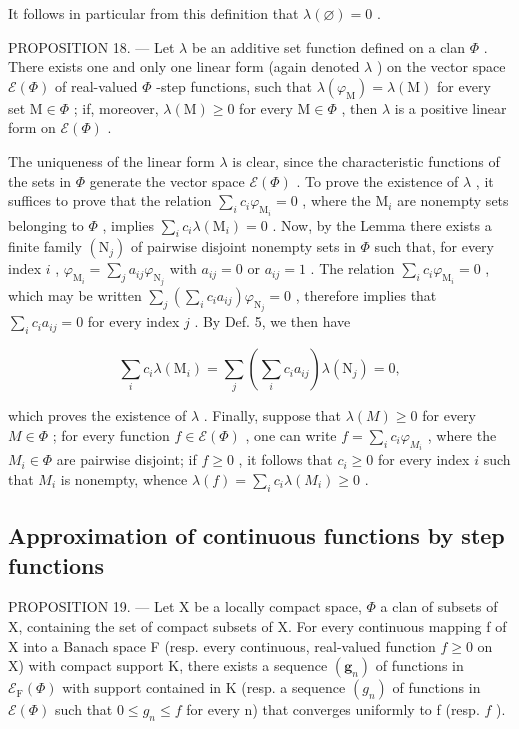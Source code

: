It follows in particular from this definition that \(\lambda(\varnothing)=0\) .

PROPOSITION 18. --- Let \(\lambda\) be an additive set function defined on a clan \(\Phi\) . There exists one and only one linear form (again denoted \(\lambda\) ) on the vector space \(\mathcal{E}(\Phi)\) of real-valued \(\Phi\) -step functions, such that \(\lambda(\varphi_{\mathrm{M}}) = \lambda(\mathrm{M})\) for every set \(\mathrm{M} \in \Phi\) ; if, moreover, \(\lambda(\mathrm{M}) \geqslant 0\) for every \(\mathrm{M} \in \Phi\) , then \(\lambda\) is a positive linear form on \(\mathcal{E}(\Phi)\) .

The uniqueness of the linear form \(\lambda\) is clear, since the characteristic functions of the sets in \(\Phi\) generate the vector space \(\mathcal{E}(\Phi)\) . To prove the existence of \(\lambda\) , it suffices to prove that the relation \(\sum_{i} c_i \varphi_{\mathrm{M}_i} = 0\) , where the \(\mathrm{M}_i\) are nonempty sets belonging to \(\Phi\) , implies \(\sum_{i} c_i \lambda(\mathrm{M}_i) = 0\) . Now, by the Lemma there exists a finite family \((\mathrm{N}_j)\) of pairwise disjoint nonempty sets in \(\Phi\) such that, for every index \(i\) , \(\varphi_{\mathrm{M}_i} = \sum_{j} a_{ij} \varphi_{\mathrm{N}_j}\) with \(a_{ij} = 0\) or \(a_{ij} = 1\) . The relation \(\sum_{i} c_i \varphi_{\mathrm{M}_i} = 0\) , which may be written \(\sum_{j} \left( \sum_{i} c_i a_{ij} \right) \varphi_{\mathrm{N}_j} = 0\) , therefore implies that \(\sum_{i} c_i a_{ij} = 0\) for every index \(j\) . By Def. 5, we then have

\[
\sum_ {i} c _ {i} \lambda (\mathrm{M} _ {i}) = \sum_ {j} \left(\sum_ {i} c _ {i} a _ {i j}\right) \lambda (\mathrm{N} _ {j}) = 0,
\]

which proves the existence of \(\lambda\) . Finally, suppose that \(\lambda(M) \geqslant 0\) for every \(M \in \Phi\) ; for every function \(f \in \mathcal{E}(\Phi)\) , one can write \(f = \sum_{i} c_i \varphi_{M_i}\) , where the \(M_i \in \Phi\) are pairwise disjoint; if \(f \geqslant 0\) , it follows that \(c_i \geqslant 0\) for every index \(i\) such that \(M_i\) is nonempty, whence \(\lambda(f) = \sum_{i} c_i \lambda(M_i) \geqslant 0\) .

\subsection{Approximation of continuous functions by step functions}

PROPOSITION 19. --- Let X be a locally compact space, \(\Phi\) a clan of subsets of X, containing the set of compact subsets of X. For every continuous mapping f of X into a Banach space F (resp. every continuous, real-valued function \(f \geqslant 0\) on X) with compact support K, there exists a sequence \((\mathbf{g}_n)\) of functions in \(\mathcal{E}_{\mathrm{F}}(\Phi)\) with support contained in K (resp. a sequence \((g_n)\) of functions in \(\mathcal{E}(\Phi)\) such that \(0 \leqslant g_n \leqslant f\) for every n) that converges uniformly to f (resp. \(f\) ).

